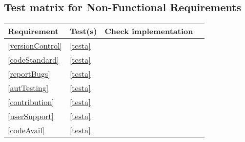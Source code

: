 \subsection{Test matrix for Non-Functional Requirements}
\begin{tabular}{|l|l|l|l|}
	\hline
	Requirement & Test(s) & Check implementation \\
	\hline
	\hline
		\ref{versionControl} & \ref{testa} \\
	\hline
		\ref{codeStandard} & \ref{testa} \\
	\hline
		\ref{reportBugs} & \ref{testa} \\
	\hline
		\ref{autTesting} & \ref{testa} \\
	\hline
		\ref{contribution} & \ref{testa} \\
	\hline
		\ref{userSupport} & \ref{testa} \\
	\hline
		\ref{codeAvail} & \ref{testa} \\
	\hline
\end{tabular}

	

